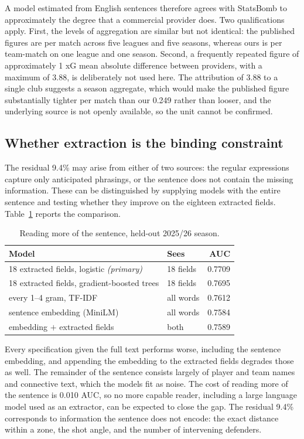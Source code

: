 \documentclass[conference]{IEEEtran}
\newcommand{\num}[1]{\mbox{#1}}
\begin{document}
A model estimated from English sentences therefore agrees with StatsBomb to
approximately the degree that a commercial provider does. Two qualifications
apply. First, the levels of aggregation are similar but not identical: the
published figures are per match across five leagues and five seasons, whereas
ours is per team-match on one league and one season. Second, a frequently
repeated figure of approximately 1 xG mean absolute difference between
providers, with a maximum of \num{3.88}, is deliberately not used here. The
attribution of \num{3.88} to a single club suggests a season aggregate, which
would make the published figure substantially tighter per match than our
\num{0.249} rather than looser, and the underlying source is not openly
available, so the unit cannot be confirmed.

\subsection{Whether extraction is the binding constraint}
\label{sec:ceiling}

The residual 9.4\% may arise from either of two sources: the regular
expressions capture only anticipated phrasings, or the sentence does not
contain the missing information. These can be distinguished by supplying models
with the entire sentence and testing whether they improve on the eighteen
extracted fields. Table~\ref{tab:ceiling} reports the comparison.

\begin{table}[t]
\caption{Reading more of the sentence, held-out 2025/26 season.}
\label{tab:ceiling}
\centering
\begin{tabular}{llr}
\toprule
Model & Sees & AUC \\
\midrule
18 extracted fields, logistic \emph{(primary)} & 18 fields & \num{0.7709} \\
18 extracted fields, gradient-boosted trees & 18 fields & \num{0.7695} \\
every 1--4 gram, TF-IDF & all words & \num{0.7612} \\
sentence embedding (MiniLM) & all words & \num{0.7584} \\
embedding $+$ extracted fields & both & \num{0.7589} \\
\bottomrule
\end{tabular}
\end{table}

Every specification given the full text performs worse, including the sentence
embedding, and appending the embedding to the extracted fields degrades those
as well. The remainder of the sentence consists largely of player and team
names and connective text, which the models fit as noise. The cost of reading
more of the sentence is \num{0.010} AUC, so no more capable reader, including a
large language model used as an extractor, can be expected to close the gap.
The residual 9.4\% corresponds to information the sentence does not encode: the
exact distance within a zone, the shot angle, and the number of intervening
defenders.
\end{document}
